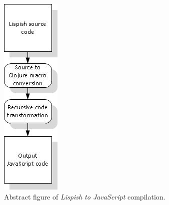 \begin{figure}[hb]
	\centering
	\includegraphics{Graphics/test.jpg}
	\caption[Abstract \textit{Lispish to JavaScript} compilation.]
   {Abstract figure of \textit{Lispish to JavaScript} compilation.}
\end{figure}